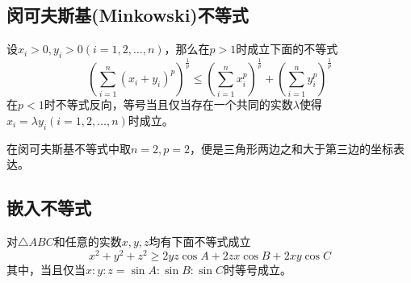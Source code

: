 \subsection{闵可夫斯基(Minkowski)不等式}


\begin{theorem}[闵可夫斯基不等式]
  设$x_i>0, y_i>0 (i=1,2,\ldots,n)$，那么在$p>1$时成立下面的不等式
  \begin{equation}
    \label{eq:holder-inequation}
    \left( \sum_{i=1}^n(x_i+y_i)^p \right)^{\frac{1}{p}} \leqslant \left( \sum_{i=1}^nx_i^p \right)^{\frac{1}{p}} + \left( \sum_{i=1}^ny_i^p \right)^{\frac{1}{p}}
  \end{equation}
  在$p<1$时不等式反向，等号当且仅当存在一个共同的实数$\lambda$使得$x_i=\lambda y_i(i=1,2,\ldots,n)$时成立。
\end{theorem}
在闵可夫斯基不等式中取$n=2,p=2$，便是三角形两边之和大于第三边的坐标表达。

\subsection{嵌入不等式}

\begin{theorem}[嵌入不等式]
  对$\triangle ABC$和任意的实数$x,y,z$均有下面不等式成立
  \begin{equation}
    \label{eq:embedding-inequation}
    x^2+y^2+z^2 \geqslant 2yz\cos{A}+2zx\cos{B}+2xy\cos{C}
  \end{equation}
  其中，当且仅当$x:y:z = \sin{A} : \sin{B} : \sin{C}$时等号成立。
\end{theorem}

